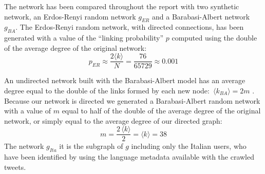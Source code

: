 \documentclass[11pt, twoside]{report}
\begin{document}
The network has been compared throughout the report with two synthetic network, an Erdos-Renyi random network $g_{ER}$ and a Barabasi-Albert network $g_{BA}$. The Erdos-Renyi random network, with directed connections, has been generated with a value of the ``linking probability'' $p$ computed using the double of the average degree of the original network:
    \begin{equation}
      p_{ER} \approx \frac{2\langle k  \rangle}{N} = \frac{76}{65729} \approx  0.001
      \label{eq:ER_probability}
    \end{equation}

 An undirected network built with the Barabasi-Albert model  has an average degree equal to the double of the links formed by each new node: $ \, \langle k_{BA} \rangle = 2 m$ \cite{network_science}. Because our network is directed we generated a Barabasi-Albert random network with a value of $m$ equal to half of the double of the average degree of the original network, or simply equal to the average degree of our directed graph:
    \begin{equation}
      m = \frac{ 2 \, \langle k \rangle}{2} =  \langle k \rangle = 38
      \label{eq:BA_model}
    \end{equation}
    The network $g_{Ita}$ it is the subgraph of $g$ including only the Italian users, who have been identified by using the language metadata available with the crawled tweets.
\end{document}
